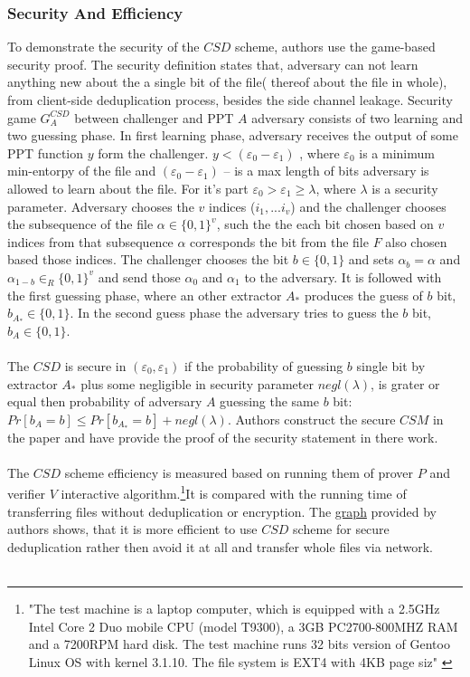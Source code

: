 \documentclass[12pt]{article}
\begin{document}
\subsubsection{Security And Efficiency}
\label{subsub:secAndeff4}

To demonstrate the security of the $CSD$ scheme, authors use the game-based security proof. The security definition states that, adversary can not learn anything new about the a single bit of the file( thereof about the file in  whole), from client-side deduplication process, besides the side channel leakage. Security game $G^{CSD}_A$ between challenger and PPT $A$ adversary consists of two learning and two guessing phase. In first learning phase, adversary receives the output of some PPT function $y$ form the challenger. $y < (\varepsilon_0 - \varepsilon_1)$ , where  $\varepsilon_0$ is a minimum min-entorpy of the file and  $(\varepsilon_0 - \varepsilon_1)$ -- is a max length of bits adversary is allowed to learn about the file. For it's part $\varepsilon_0>\varepsilon_1  \geq\lambda$, where $\lambda$ is a security parameter. Adversary chooses the $v$ indices ($i_1, ...i_v$)  and the challenger chooses the subsequence of the file $\alpha \in \{0,1\}^v$, such the the each bit chosen based on $v$ indices from that subsequence $\alpha$ corresponds the bit from the file $F$ also chosen based those indices. The challenger chooses the bit  $b \in \{0,1\}$ and sets $\alpha_b=\alpha$ and $\alpha_{1-b}  \in_R \{0,1\}^v$ and send those $\alpha_0$ and $\alpha_1$ to the adversary. It is followed with the first guessing phase, where an other extractor $A_*$ produces the guess of $b$ bit, $b_{A_*} \in \{0,1\}$. In the second guess phase the adversary tries to guess the $b$ bit, $b_A \in \{0,1\}$.\\\\
The $CSD$ is secure in $(\varepsilon_0, \varepsilon_1)$ if the probability of guessing $b$ single bit by extractor $A_*$ plus some negligible in security parameter $negl(\lambda)$, is grater or equal then probability of adversary $A$ guessing the same $b$ bit: $Pr[b_A=b]\leq Pr[b_{A_*}=b]+negl(\lambda)$. Authors construct the secure $CSM$ in the paper and have provide the proof of the security statement in there work.\\\\
The $CSD$ scheme efficiency is measured based on running them of prover $P$ and verifier $V$ interactive algorithm.\footnote{"The test machine is a laptop computer, which is equipped
with a 2.5GHz Intel Core 2 Duo mobile CPU (model T9300), a 3GB PC2700-800MHZ RAM and a 7200RPM hard disk. The test machine runs 32 bits version of Gentoo Linux OS with kernel 3.1.10. The file system is EXT4 with 4KB page siz" \cite{Leakage-Resilient}}It is compared with the running time of transferring files without deduplication or encryption. The \hyperref[fig:CSD]{graph} provided by authors shows, that it is more efficient to use $CSD$ scheme for secure deduplication rather then avoid it at all and transfer whole files via network.\\\\
\end{document}
